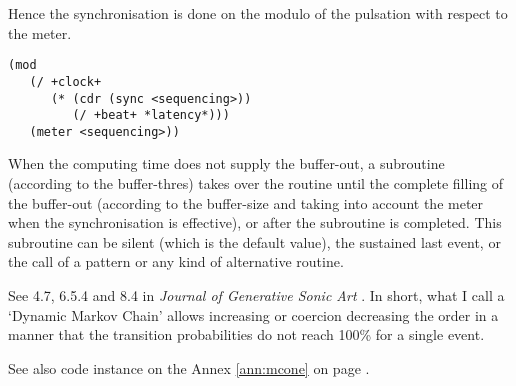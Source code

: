 Hence the synchronisation is done on the modulo of the pulsation with respect to the meter.
\begin{lstlisting}[language=N3]
(mod 
   (/ +clock+ 
      (* (cdr (sync <sequencing>)) 
         (/ +beat+ *latency*))) 
   (meter <sequencing>))   
\end{lstlisting}

\bigskip
\bigskip

{}

\bigskip

When the computing time does not supply the buffer-out, a subroutine (according to the buffer-thres) takes over the routine until the complete filling of the buffer-out (according to the buffer-size and  taking into account the meter when the synchronisation is effective), or after the subroutine is completed. This subroutine can be silent (which is the default value), the sustained last event, or the call of a pattern or any kind of alternative routine.

\bigskip
\bigskip


\bigskip

See  4.7, 6.5.4 and 8.4 in \textsl{Journal of Generative Sonic Art} \citep{yi}. In short, what I call a `Dynamic Markov Chain' allows increasing or coercion decreasing the order in a manner that the transition probabilities do not reach 100\% for a single event.
 
See also code instance on the Annex \ref{ann:mcone} on page \pageref{ann:mcone}.

%
%

